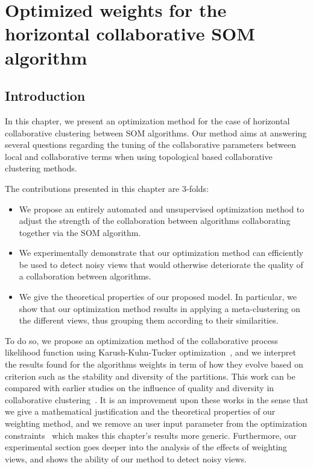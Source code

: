 \chapter{Optimized weights for the horizontal collaborative SOM algorithm}

\minitoc{}
\newpage

\section{Introduction}

In this chapter, we present an optimization method for the case of horizontal collaborative clustering between SOM algorithms. Our method aims at answering several questions regarding the tuning of the collaborative parameters between local and collaborative terms when using topological based collaborative clustering methods. 

The contributions presented in this chapter are 3-folds:

\begin{itemize}
	\item We propose an entirely automated and unsupervised optimization method to adjust the strength of the collaboration between algorithms collaborating together via the SOM algorithm.
	\item We experimentally demonstrate that our optimization method can efficiently be used to detect noisy views that would otherwise deteriorate the quality of a collaboration between algorithms.
	\item We give the theoretical properties of our proposed model. In particular, we show that our optimization method results in applying a meta-clustering on the different views, thus grouping them according to their similarities. 
\end{itemize} 
To do so, we propose an optimization method of the collaborative process likelihood function using Karush-Kuhn-Tucker optimization~\cite{KKT1}, and we interpret the results found for the algorithms weights in term of how they evolve based on criterion such as the stability and diversity of the partitions. This work can be compared with earlier studies on the influence of quality and diversity in collaborative clustering~\cite{grozavu2011learning,DBLP:conf/ssci/RastinCGB15,DBLP:conf/ijcnn/GrozavuCB14,Sublime2017}. It is an improvement upon these works in the sense that we give a mathematical justification and the theoretical properties of our weighting method, and we remove an user input parameter from the optimization constraints~\cite{Sublime2017} which makes this chapter's results more generic. Furthermore, our experimental section goes deeper into the analysis of the effects of weighting views, and shows the ability of our method to detect noisy views.


